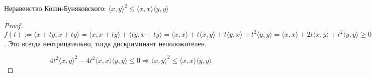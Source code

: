 \begin{conj}
    Неравенство Коши-Буняковского: $\langle x, y \rangle^2 \leqslant \langle x, x \rangle \langle y, y \rangle$
\end{conj} 

\begin{proof}

$f(t):=\langle x+ty, x+ty\rangle = \langle x, x+ty \rangle + \langle ty, x+ty \rangle =\langle x, x \rangle + t\langle x, y \rangle + t\langle y, x \rangle + t^2\langle y, y \rangle = \langle x, x \rangle + 2t\langle x, y \rangle + t^2\langle y, y \rangle \geqslant 0$. Это всегда неотрицательно, тогда дискриминант неположителен.

\[4t^2\langle x, y \rangle^2 - 4t^2\langle x, x \rangle \langle y, y \rangle \leqslant 0 \Longrightarrow \langle x, y \rangle^2 \leqslant \langle x, x \rangle \langle y, y \rangle\]
\end{proof}